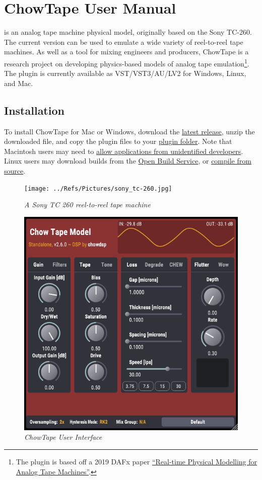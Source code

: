 \documentclass[landscape,twocolumn,a5paper]{manual}
\def\pluginfolder{\href{https://help.uaudio.com/hc/en-us/articles/210216306-Default-Install-Locations-for-UAD-Plug-Ins}{plugin folder}}
\def\dllink#1{\href{https://github.com/jatinchowdhury18/AnalogTapeModel/releases}{#1}}
\begin{document}
\section{ChowTape User Manual}

\noindent
{} is an analog tape machine physical model,
originally based on the Sony TC-260. The current version
can be used to emulate a wide variety of reel-to-reel tape
machines. As well as a tool for mixing engineers and producers,
ChowTape is a research project on developing physics-based
models of analog tape emulation\footnote{The plugin is based off a 2019 DAFx paper
\href{http://dafx2019.bcu.ac.uk/papers/DAFx2019_paper_3.pdf}{``Real-time Physical Modelling for Analog Tape Machines''}.}.
The plugin is currently available as VST/VST3/AU/LV2 for
Windows, Linux, and Mac.

\subsection{Installation}
To install ChowTape for Mac or Windows, download the
\dllink{latest release}, unzip the downloaded file, and copy
the plugin files to your \pluginfolder. Note that Macintosh
users may need to
\href{https://www.imore.com/how-open-apps-anywhere-macos-catalina-and-mojave}{allow applications from unidentified developers}.
Linux users may download builds from the
\href{https://build.opensuse.org/package/show/home:kill_it:JUCE/CHOWTapeModel}{Open Build Service}, or
\href{https://github.com/jatinchowdhury18/AnalogTapeModel/blob/master/BUILDING.md}{compile from source}.

\begin{figure}[ht]
    \center
    \texttt{[image: ../Refs/Pictures/sony\_tc-260.jpg]}
    \caption{\label{TapeMachine}{\it A Sony TC 260 reel-to-reel tape machine}}
\end{figure}

\begin{figure}[ht]
    \center
    \includegraphics[width=0.6\columnwidth]{../Plugin/Screenshots/full_gui.png}
    \caption{\label{h_bias}{\it ChowTape User Interface}}
\end{figure}
\end{document}
